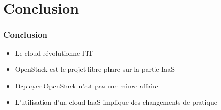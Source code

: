   \section*{Conclusion}
  \begin{frame}
    \frametitle{Conclusion}
    \begin{itemize}
      \item Le cloud révolutionne l'IT
      \item OpenStack est le projet libre phare sur la partie IaaS
      \item Déployer OpenStack n'est pas une mince affaire
      \item L'utilisation d'un cloud IaaS implique des changements de pratique
    \end{itemize}
  \end{frame}



